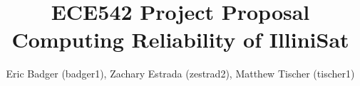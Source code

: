 \documentclass[notitlepage,groupedaddress]{IEEEtran}
\begin{document}
\title{ECE542 Project Proposal\\ Computing Reliability of IlliniSat}
\author{Eric Badger (badger1), Zachary Estrada (zestrad2), Matthew Tischer
(tischer1)}

\maketitle












\end{document}
